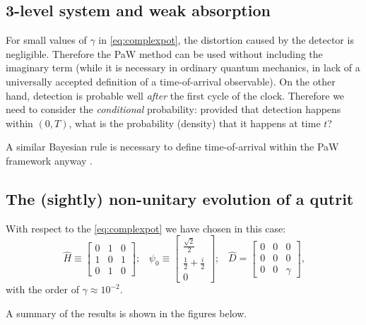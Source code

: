 \documentclass[landscape]{a0poster}
\DeclareMathOperator*{\repr}{\equiv}      %
\begin{document}
\begin{multicols}{3}
\section*{3-level system and weak absorption}

For small values of $\gamma$ in \eqref{eq:complexpot},
the distortion caused by the detector is negligible.
Therefore the PaW method can be used without including the imaginary term
(while it is necessary in ordinary quantum mechanics,
in lack of a universally accepted definition of a time-of-arrival observable).
On the other hand, detection is probable well \emph{after} the first cycle of the clock.
Therefore we need to consider the \emph{conditional} probability: provided that detection happens
within $(0, T)$, what is the probability (density) that it happens at time $t$?

A similar Bayesian rule is necessary to define time-of-arrival within the PaW framework
anyway \cite{Maccone:QMOT}.

\subsection*{The (sightly) non-unitary evolution of a qutrit}
With respect to the \eqref{eq:complexpot} we have chosen in this case:
\begin{equation}
  \hat{H} \repr \left[\begin{matrix}0 & 1 & 0\\1 & 0 & 1\\0 & 1 & 0\end{matrix}\right] \text{;} \quad
  \psi_0 \repr \left[\begin{matrix}\frac{\sqrt{2}}{2}\\\frac{1}{2} + \frac{i}{2}\\0\end{matrix}\right] \text{;} \quad
  \hat{D} = \left[\begin{matrix}0 & 0 & 0\\0 & 0 & 0\\0 & 0 & \gamma\end{matrix}\right] \text{,}
\end{equation}
with the order of $\gamma \approx 10^{-2}$.

A summary of the results is shown in the figures below.
\vspace{0.5cm}


\end{multicols}
\end{document}
